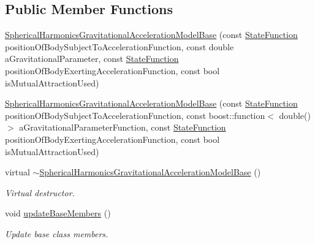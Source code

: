 \subsection*{Public Member Functions}
\begin{DoxyCompactItemize}
\item 
\hyperlink{classtudat_1_1gravitation_1_1SphericalHarmonicsGravitationalAccelerationModelBase_a693001dda5e9013564542cd78b585b84}{Spherical\+Harmonics\+Gravitational\+Acceleration\+Model\+Base} (const \hyperlink{classtudat_1_1gravitation_1_1SphericalHarmonicsGravitationalAccelerationModelBase_a4ca706c4f941be481fc5f490e49390d8}{State\+Function} position\+Of\+Body\+Subject\+To\+Acceleration\+Function, const double a\+Gravitational\+Parameter, const \hyperlink{classtudat_1_1gravitation_1_1SphericalHarmonicsGravitationalAccelerationModelBase_a4ca706c4f941be481fc5f490e49390d8}{State\+Function} position\+Of\+Body\+Exerting\+Acceleration\+Function, const bool is\+Mutual\+Attraction\+Used)
\item 
\hyperlink{classtudat_1_1gravitation_1_1SphericalHarmonicsGravitationalAccelerationModelBase_a9e5565cee2aa329c7718ba1c3cc11458}{Spherical\+Harmonics\+Gravitational\+Acceleration\+Model\+Base} (const \hyperlink{classtudat_1_1gravitation_1_1SphericalHarmonicsGravitationalAccelerationModelBase_a4ca706c4f941be481fc5f490e49390d8}{State\+Function} position\+Of\+Body\+Subject\+To\+Acceleration\+Function, const boost\+::function$<$ double() $>$ a\+Gravitational\+Parameter\+Function, const \hyperlink{classtudat_1_1gravitation_1_1SphericalHarmonicsGravitationalAccelerationModelBase_a4ca706c4f941be481fc5f490e49390d8}{State\+Function} position\+Of\+Body\+Exerting\+Acceleration\+Function, const bool is\+Mutual\+Attraction\+Used)
\item 
virtual \hyperlink{classtudat_1_1gravitation_1_1SphericalHarmonicsGravitationalAccelerationModelBase_a4fed916f0154efda68edf6d40f4a08b8}{$\sim$\+Spherical\+Harmonics\+Gravitational\+Acceleration\+Model\+Base} ()
\begin{DoxyCompactList}\small\item\em Virtual destructor. \end{DoxyCompactList}\item 
void \hyperlink{classtudat_1_1gravitation_1_1SphericalHarmonicsGravitationalAccelerationModelBase_ac6cc02edc064e51ab02fdb5cfdea9082}{update\+Base\+Members} ()
\begin{DoxyCompactList}\small\item\em Update base class members. \end{DoxyCompactList}\item 

\end{DoxyCompactItemize}
